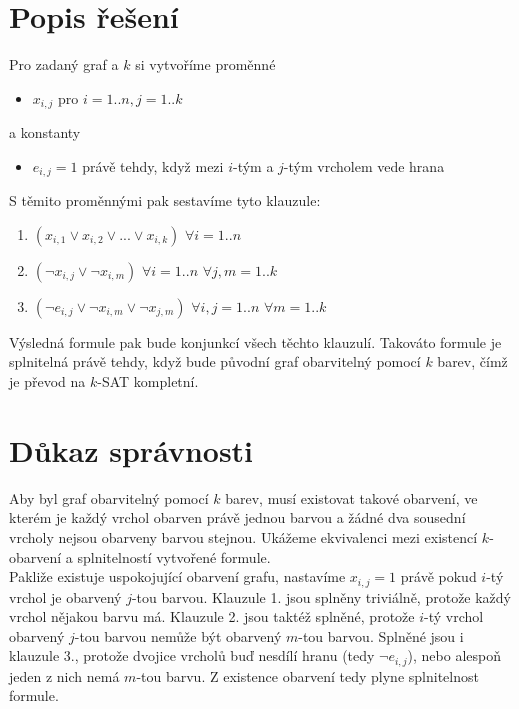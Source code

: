 \documentclass{scrartcl}
\begin{document}
\section{Popis řešení}
Pro zadaný graf a $k$ si vytvoříme proměnné

\begin{itemize}
        \item $x_{i,j}$ pro $i = 1..n, j = 1..k$
\end{itemize}

a konstanty

\begin{itemize}
        \item $e_{i,j} = 1$ právě tehdy, když mezi $i$-tým a $j$-tým vrcholem vede hrana 
\end{itemize}

S těmito proměnnými pak sestavíme tyto klauzule:
\begin{enumerate}
        \item $(x_{i,1} \lor x_{i,2} \lor ... \lor x_{i,k})$ $\forall i = 1..n$
        \item $(\neg x_{i,j} \lor \neg x_{i,m})$ $\forall i = 1..n$ $\forall j,m = 1..k$ 
        \item $(\neg e_{i,j} \lor \neg x_{i, m} \lor \neg x_{j,m})$ $\forall i,j = 1..n$ $\forall m = 1..k$
\end{enumerate}

Výsledná formule pak bude konjunkcí všech těchto klauzulí. Takováto formule je splnitelná právě tehdy, když bude původní graf obarvitelný pomocí $k$ barev, čímž je převod na $k$-SAT kompletní.

\section{Důkaz správnosti}
Aby byl graf obarvitelný pomocí $k$ barev, musí existovat takové obarvení, ve kterém je každý vrchol obarven právě jednou barvou a žádné dva sousední vrcholy nejsou obarveny barvou stejnou. Ukážeme ekvivalenci mezi existencí $k$-obarvení a splnitelností vytvořené formule.\\

Pakliže existuje uspokojující obarvení grafu, nastavíme $x_{i,j} = 1$ právě pokud $i$-tý vrchol je obarvený $j$-tou barvou. Klauzule 1. jsou splněny triviálně, protože každý vrchol nějakou barvu má. Klauzule 2. jsou taktéž splněné, protože $i$-tý vrchol obarvený $j$-tou barvou nemůže být obarvený $m$-tou barvou. Splněné jsou i klauzule 3., protože dvojice vrcholů buď nesdílí hranu (tedy $\neg e_{i,j}$), nebo alespoň jeden z nich nemá $m$-tou barvu. Z existence obarvení tedy plyne splnitelnost formule.\\
\end{document}
